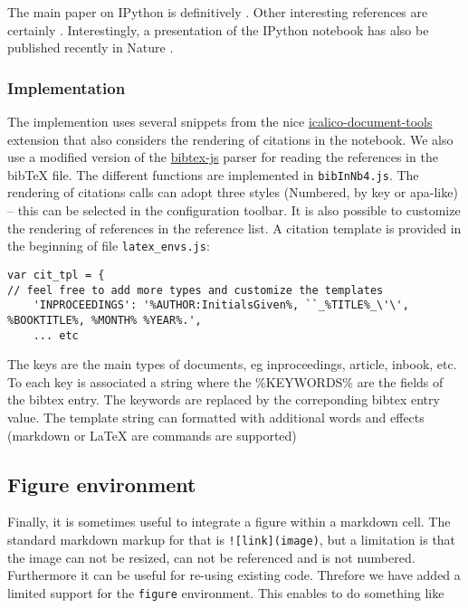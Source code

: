 The main paper on IPython is definitively \cite{PER-GRA:2007}. Other
interesting references are certainly
\cite{mckinney2012python, rossant2013learning}. Interestingly, a
presentation of the IPython notebook has also be published recently in
Nature \cite{shen2014interactive}.

    \subsubsection{Implementation}\label{implementation}

    The implemention uses several snippets from the nice
\href{https://bitbucket.org/ipre/calico/downloads/}{icalico-document-tools}
extension that also considers the rendering of citations in the
notebook. We also use a modified version of the
\href{https://code.google.com/p/bibtex-js/}{bibtex-js} parser for
reading the references in the bibTeX file. The different functions are
implemented in \texttt{bibInNb4.js}. The rendering of citations calls
can adopt three styles (Numbered, by key or apa-like) -- this can be
selected in the configuration toolbar. It is also possible to customize
the rendering of references in the reference list. A citation template
is provided in the beginning of file \texttt{latex\_envs.js}:

\begin{verbatim}
var cit_tpl = {
// feel free to add more types and customize the templates
    'INPROCEEDINGS': '%AUTHOR:InitialsGiven%, ``_%TITLE%_\'\', %BOOKTITLE%, %MONTH% %YEAR%.',
    ... etc
\end{verbatim}

The keys are the main types of documents, eg inproceedings, article,
inbook, etc. To each key is associated a string where the \%KEYWORDS\%
are the fields of the bibtex entry. The keywords are replaced by the
correponding bibtex entry value. The template string can formatted with
additional words and effects (markdown or LaTeX are commands are
supported)

    \subsection{Figure environment}\label{figure-environment}

    Finally, it is sometimes useful to integrate a figure within a markdown
cell. The standard markdown markup for that is
\texttt{!{[}link{]}(image)}, but a limitation is that the image can not
be resized, can not be referenced and is not numbered. Furthermore it
can be useful for re-using existing code. Threfore we have added a
limited support for the \texttt{figure} environment. This enables to do
something like

